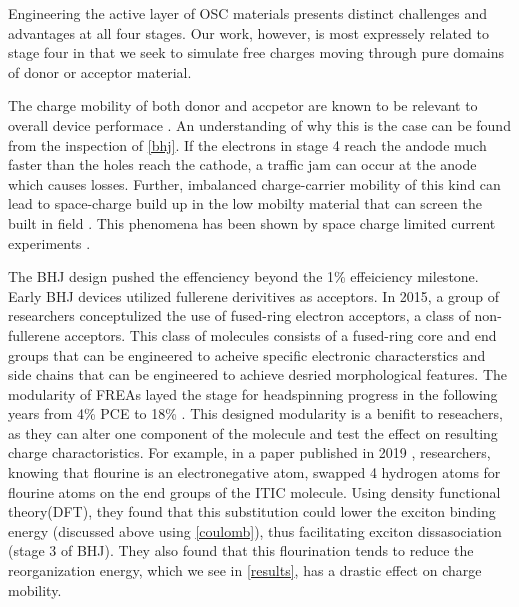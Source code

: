 Engineering the active layer of OSC materials presents distinct challenges and advantages at
all four stages. Our work, however, 
is most expressely related to stage four in that we seek to simulate free charges moving
through pure domains of donor or acceptor material. 


The charge mobility of both donor and accpetor
are known to be relevant to overall device performace \cite{Wang2019e}.
An understanding of why this is the case can be found from the inspection of \autoref{bhj}.
If the electrons in stage 4 reach the andode much faster than the holes reach the cathode, a traffic jam can
occur at the anode which causes losses. 
Further, imbalanced charge-carrier mobility of this kind can lead to space-charge build up in the 
low mobilty material that can screen the built in field \cite{Bartelt2015}.
This phenomena has been shown by space charge limited current experiments \cite{Small2013}.

The BHJ design pushed the effenciency beyond the 1\% effeiciency milestone. Early BHJ devices utilized
fullerene derivitives as acceptors. In 2015, a group of researchers conceptulized the use of
fused-ring electron acceptors, a class of non-fullerene acceptors. This class of molecules consists of
a fused-ring core and end groups that can be engineered to acheive specific electronic characterstics and side
chains that can be engineered to achieve desried morphological features. The modularity of FREAs
layed the stage for headspinning progress in the following years from 4\% PCE to 18\% \cite{Wang2021a}. 
This designed modularity is a benifit to reseachers, as they can alter one component of the molecule and test
the effect on resulting charge charactoristics. For example, in a paper published in 2019 \cite{Benatto2019},
researchers, knowing that flourine is an electronegative atom, swapped 4 hydrogen atoms for flourine atoms on
the end groups of the ITIC molecule. Using density functional theory(DFT), they found 
that this substitution could lower the exciton
binding energy (discussed above using \autoref{coulomb}), thus facilitating exciton dissasociation (stage 3 of
BHJ). They also found
that this flourination tends to reduce the reorganization energy, which we see in \autoref{results}, has a
drastic effect on charge mobility.

